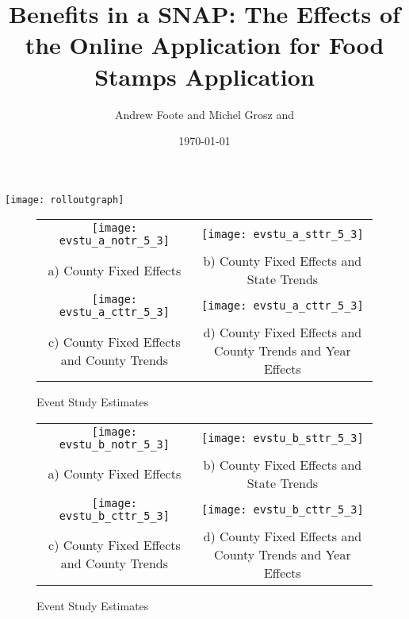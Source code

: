 \documentclass[11pt,letterpaper]{article}
\title{Benefits in a SNAP: The Effects of the Online Application for Food Stamps Application}
\author{Andrew Foote and Michel Grosz and}
\date{\today\\  }
\begin{document}
\maketitle

\texttt{[image: rolloutgraph]}

\begin{figure}\caption{Event Study Estimates}
\begin{tabular}{cc}
\texttt{[image: evstu\_a\_notr\_5\_3]}&\texttt{[image: evstu\_a\_sttr\_5\_3]}\\
a) County Fixed Effects&b) County Fixed Effects and State Trends\\
\texttt{[image: evstu\_a\_cttr\_5\_3]}&\texttt{[image: evstu\_a\_cttr\_5\_3]}\\
c) County Fixed Effects and County Trends&d) County Fixed Effects and County Trends and Year Effects\\
\end{tabular}
\end{figure}


\begin{figure}\caption{Event Study Estimates}
\begin{tabular}{cc}
\texttt{[image: evstu\_b\_notr\_5\_3]}&\texttt{[image: evstu\_b\_sttr\_5\_3]}\\
a) County Fixed Effects&b) County Fixed Effects and State Trends\\
\texttt{[image: evstu\_b\_cttr\_5\_3]}&\texttt{[image: evstu\_b\_cttr\_5\_3]}\\
c) County Fixed Effects and County Trends&d) County Fixed Effects and County Trends and Year Effects\\
\end{tabular}
\end{figure}
\end{document}
